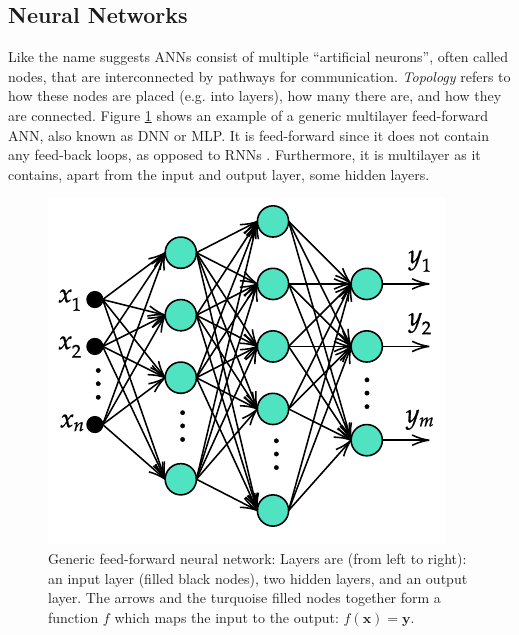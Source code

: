 \documentclass[../main.tex]{subfiles}
\begin{document}
\subsection{Neural Networks}
\label{sec:A-NeuralNetworks}
Like the name suggests \acp{ANN} consist of multiple ``artificial neurons'', often called nodes, that are interconnected by pathways for communication.
\textit{Topology} refers to how these nodes are placed (e.g. into layers), how many there are, and how they are connected.
Figure \ref{fig:generic-ann} shows an example of a generic multilayer feed-forward \ac{ANN}, also known as \ac{DNN} or \ac{MLP}.
It is feed-forward since it does not contain any feed-back loops, as opposed to \acp{RNN} \cite{Goodfellow2016, Haykin2009}. Furthermore, it is multilayer as it contains, apart from the input and output layer, some hidden layers.

\begin{figure}[ht]
    \centering
    \includegraphics{img/generic-ann-diagram}
    \caption{Generic feed-forward neural network: Layers are (from left to right): an input layer (filled black nodes), two hidden layers, and an output layer. The arrows and the turquoise filled nodes together form a function $f$ which maps the input to the output: $f(\mathbf{x})=\mathbf{y} $.}
    \label{fig:generic-ann}
\end{figure}
\end{document}
